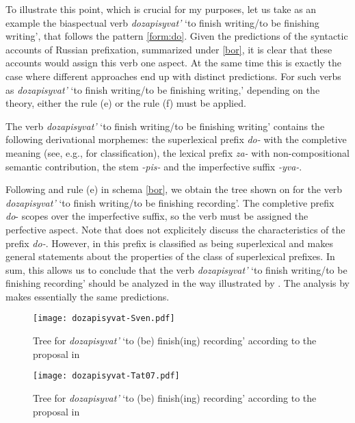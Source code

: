 To illustrate this point, which is crucial for my purposes, let us take as an example the biaspectual verb \textit{dozapisyvat'} `to finish writing/to be finishing writing', that follows the pattern \ref{form:do}. Given the predictions of the syntactic accounts of Russian prefixation, summarized under \ref{bor}, it is clear that these accounts would assign this verb one aspect. At the same time this is exactly the case where different approaches end up with distinct predictions. For such verbs as \textit{dozapisyvat'} `to finish writing/to be finishing writing,' depending on the theory, either the rule (e) or the rule (f) must be applied.

The verb \textit{dozapisyvat'} `to finish writing/to be finishing writing' contains the following derivational morphemes: the superlexical prefix \textit{do-} with the completive meaning (see, e.g., \citealt{Svenonius:04a} for classification), the lexical prefix \textit{za-} with non-compositional semantic contribution, the stem \textit{-pis-} and the imperfective suffix \textit{-yva-}. 

Following \citet{Svenonius:04b} and rule (e) in schema \ref{bor}, we obtain the tree shown on  for the verb \textit{dozapisyvat'} `to finish writing/to be finishing recording'. The completive prefix \textit{do}- scopes over the imperfective suffix, so the verb must be assigned the perfective aspect. Note that \citet{Svenonius:04b} does not explicitely discuss the characteristics of the prefix \textit{do-}. However, in \citet{Svenonius:04a} this prefix is classified as being superlexical and \citet{Svenonius:04b} makes general statements about the properties of the class of superlexical prefixes. In sum, this allows us to conclude that the verb \textit{dozapisyvat'} `to finish writing/to be finishing recording' should be analyzed in the way illustrated by . The analysis by \citet[357]{Ramchand:04} makes essentially the same predictions.

\begin{figure}[h]
\caption{Tree for \textit{dozapisyvat'} `to (be) finish(ing) recording' according to the proposal in \citealt{Svenonius:04b}\label{tree:sven}}
\texttt{[image: dozapisyvat-Sven.pdf]}
\end{figure}

\begin{figure}[h]
\caption{Tree for \textit{dozapisyvat'} `to (be) finish(ing) recording' according to the proposal in \citealt{Tatevosov:07}\label{tree:tat}}
\texttt{[image: dozapisyvat-Tat07.pdf]}
\end{figure}

